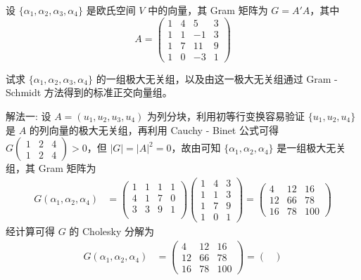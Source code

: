 \documentclass[../../main.tex]{subfiles}
\begin{document}
\begin{example}\label{example:例9.37}
设 \(\{\alpha_1,\alpha_2,\alpha_3,\alpha_4\}\) 是欧氏空间 \(V\) 中的向量，其 Gram 矩阵为 \(G = A'A\)，其中
\[
A = 
\begin{pmatrix}
1 & 4 & 5 & 3 \\
1 & 1 & -1 & 3 \\
1 & 7 & 11 & 9 \\
1 & 0 & -3 & 1
\end{pmatrix}
\]

试求 \(\{\alpha_1,\alpha_2,\alpha_3,\alpha_4\}\) 的一组极大无关组，以及由这一极大无关组通过 Gram - Schmidt 方法得到的标准正交向量组。
\end{example}
\begin{solution}
{\color{blue}解法一:}
设 \(A=(u_1,u_2,u_3,u_4)\) 为列分块，利用初等行变换容易验证 \(\{u_1,u_2,u_4\}\) 是 \(A\) 的列向量的极大无关组，再利用 Cauchy - Binet 公式可得 \(G\begin{pmatrix}1&2&4\\1&2&4\end{pmatrix}>0\)，但 \(|G| = |A|^2 = 0\)，故由可知 \(\{\alpha_1,\alpha_2,\alpha_4\}\) 是一组极大无关组，其 Gram 矩阵为
\begin{align*}
G(\alpha_1,\alpha_2,\alpha_4)&=
\left( \begin{matrix}
1&		1&		1&		1\\
4&		1&		7&		0\\
3&		3&		9&		1\\
\end{matrix} \right) 
\begin{pmatrix}
1 & 4 & 3 \\
1 & 1 & 3 \\
1 & 7 & 9 \\
1 & 0 & 1
\end{pmatrix}
=
\begin{pmatrix}
4 & 12 & 16 \\
12 & 66 & 78 \\
16 & 78 & 100
\end{pmatrix}
\end{align*}
经计算可得 \(G\) 的 Cholesky 分解为
\begin{align*}
G(\alpha_1,\alpha_2,\alpha_4)&=
\begin{pmatrix}
4 & 12 & 16 \\
12 & 66 & 78 \\
16 & 78 & 100
\end{pmatrix}
=
\begin{pmatrix}

\end{pmatrix}
\end{align*}
\end{solution}
\end{document}
